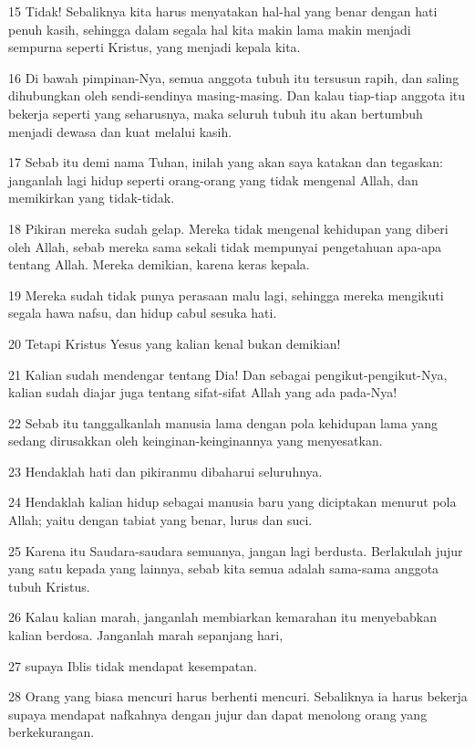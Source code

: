 \par 15 Tidak! Sebaliknya kita harus menyatakan hal-hal yang benar dengan hati penuh kasih, sehingga dalam segala hal kita makin lama makin menjadi sempurna seperti Kristus, yang menjadi kepala kita.
\par 16 Di bawah pimpinan-Nya, semua anggota tubuh itu tersusun rapih, dan saling dihubungkan oleh sendi-sendinya masing-masing. Dan kalau tiap-tiap anggota itu bekerja seperti yang seharusnya, maka seluruh tubuh itu akan bertumbuh menjadi dewasa dan kuat melalui kasih.
\par 17 Sebab itu demi nama Tuhan, inilah yang akan saya katakan dan tegaskan: janganlah lagi hidup seperti orang-orang yang tidak mengenal Allah, dan memikirkan yang tidak-tidak.
\par 18 Pikiran mereka sudah gelap. Mereka tidak mengenal kehidupan yang diberi oleh Allah, sebab mereka sama sekali tidak mempunyai pengetahuan apa-apa tentang Allah. Mereka demikian, karena keras kepala.
\par 19 Mereka sudah tidak punya perasaan malu lagi, sehingga mereka mengikuti segala hawa nafsu, dan hidup cabul sesuka hati.
\par 20 Tetapi Kristus Yesus yang kalian kenal bukan demikian!
\par 21 Kalian sudah mendengar tentang Dia! Dan sebagai pengikut-pengikut-Nya, kalian sudah diajar juga tentang sifat-sifat Allah yang ada pada-Nya!
\par 22 Sebab itu tanggalkanlah manusia lama dengan pola kehidupan lama yang sedang dirusakkan oleh keinginan-keinginannya yang menyesatkan.
\par 23 Hendaklah hati dan pikiranmu dibaharui seluruhnya.
\par 24 Hendaklah kalian hidup sebagai manusia baru yang diciptakan menurut pola Allah; yaitu dengan tabiat yang benar, lurus dan suci.
\par 25 Karena itu Saudara-saudara semuanya, jangan lagi berdusta. Berlakulah jujur yang satu kepada yang lainnya, sebab kita semua adalah sama-sama anggota tubuh Kristus.
\par 26 Kalau kalian marah, janganlah membiarkan kemarahan itu menyebabkan kalian berdosa. Janganlah marah sepanjang hari,
\par 27 supaya Iblis tidak mendapat kesempatan.
\par 28 Orang yang biasa mencuri harus berhenti mencuri. Sebaliknya ia harus bekerja supaya mendapat nafkahnya dengan jujur dan dapat menolong orang yang berkekurangan.
